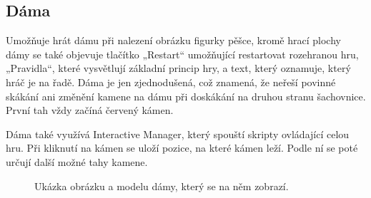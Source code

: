 \documentclass[12pt, a4paper,
twoside,        %
openright
]{report}
\begin{document}
\newpage

\subsection{Dáma}	
Umožňuje hrát dámu při nalezení obrázku figurky pěšce, kromě hrací plochy dámy se také objevuje tlačítko „Restart“ umožňující restartovat rozehranou hru, „Pravidla“, které vysvětlují základní princip hry, a text, který oznamuje, který hráč je na řadě. Dáma je jen zjednodušená, což znamená, že neřeší povinné skákání ani změnění kamene na dámu při doskákání na druhou stranu šachovnice. První tah vždy začíná červený kámen.  

Dáma také využívá Interactive Manager, který spouští skripty ovládající celou hru. Při kliknutí na kámen se uloží pozice, na které kámen leží. Podle ní se poté určují další možné tahy kamene. 


\begin{figure}[H]
	\centering
	\qquad
	\caption{Ukázka obrázku a modelu dámy, který se na něm zobrazí.}
	\label{fig:checkers}
\end{figure}
\end{document}
